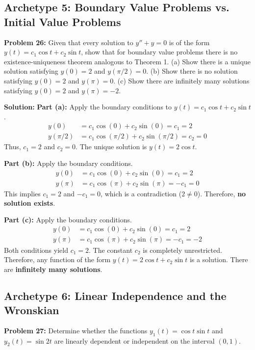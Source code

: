 \documentclass[12pt]{article}
\begin{document}
\subsection{Archetype 5: Boundary Value Problems vs. Initial Value Problems}
\textbf{Problem 26:} Given that every solution to $y'' + y = 0$ is of the form $y(t) = c_1 \cos t + c_2 \sin t$, show that for boundary value problems there is no existence-uniqueness theorem analogous to Theorem 1.
(a) Show there is a unique solution satisfying $y(0) = 2$ and $y(\pi/2) = 0$.
(b) Show there is no solution satisfying $y(0) = 2$ and $y(\pi) = 0$.
(c) Show there are infinitely many solutions satisfying $y(0) = 2$ and $y(\pi) = -2$.

\textbf{Solution:}
\textbf{Part (a):} Apply the boundary conditions to $y(t) = c_1 \cos t + c_2 \sin t$.
\begin{align*}
    y(0) &= c_1 \cos(0) + c_2 \sin(0) = c_1 = 2 \\
    y(\pi/2) &= c_1 \cos(\pi/2) + c_2 \sin(\pi/2) = c_2 = 0
\end{align*}
Thus, $c_1 = 2$ and $c_2 = 0$. The unique solution is $y(t) = 2 \cos t$.

\textbf{Part (b):} Apply the boundary conditions.
\begin{align*}
    y(0) &= c_1 \cos(0) + c_2 \sin(0) = c_1 = 2 \\
    y(\pi) &= c_1 \cos(\pi) + c_2 \sin(\pi) = -c_1 = 0
\end{align*}
This implies $c_1 = 2$ and $-c_1 = 0$, which is a contradiction ($2 \neq 0$). Therefore, \textbf{no solution exists}.

\textbf{Part (c):} Apply the boundary conditions.
\begin{align*}
    y(0) &= c_1 \cos(0) + c_2 \sin(0) = c_1 = 2 \\
    y(\pi) &= c_1 \cos(\pi) + c_2 \sin(\pi) = -c_1 = -2
\end{align*}
Both conditions yield $c_1 = 2$. The constant $c_2$ is completely unrestricted. Therefore, any function of the form $y(t) = 2 \cos t + c_2 \sin t$ is a solution. There are \textbf{infinitely many solutions}.

\subsection{Archetype 6: Linear Independence and the Wronskian}
\textbf{Problem 27:} Determine whether the functions $y_1(t) = \cos t \sin t$ and $y_2(t) = \sin 2t$ are linearly dependent or independent on the interval $(0, 1)$.
\end{document}
